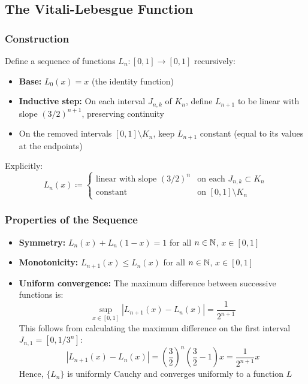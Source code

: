 \subsection{The Vitali-Lebesgue Function}

\subsubsection{Construction}

Define a sequence of functions $L_n:[0,1] \to [0,1]$ recursively:

\begin{itemize}
    \item \textbf{Base:} $L_0(x) = x$ (the identity function)
    \item \textbf{Inductive step:} On each interval $J_{n,k}$ of $K_n$, define $L_{n+1}$ to be linear with slope $(3/2)^{n+1}$, preserving continuity
    \item On the removed intervals $[0,1] \setminus K_n$, keep $L_{n+1}$ constant (equal to its values at the endpoints)
\end{itemize}

Explicitly:
\[
L_n(x) \coloneqq 
\begin{cases}
\text{linear with slope } (3/2)^n & \text{on each } J_{n,k} \subset K_n \\
\text{constant} & \text{on } [0,1] \setminus K_n
\end{cases}
\]

\subsubsection{Properties of the Sequence}

\begin{itemize}
    \item \textbf{Symmetry:} $L_n(x) + L_n(1-x) = 1$ for all $n \in \mathbb{N}$, $x \in [0,1]$
    \item \textbf{Monotonicity:} $L_{n+1}(x) \leq L_n(x)$ for all $n \in \mathbb{N}$, $x \in [0,1]$
    \item \textbf{Uniform convergence:} The maximum difference between successive functions is:
    \[
    \sup_{x \in [0,1]} |L_{n+1}(x) - L_n(x)| = \frac{1}{2^{n+1}}
    \]
    This follows from calculating the maximum difference on the first interval $J_{n,1} = [0, 1/3^n]$:
    \[
    |L_{n+1}(x) - L_n(x)| = \left( \frac{3}{2} \right)^n \left( \frac{3}{2} - 1 \right) x = \frac{1}{2^{n+1}} x
    \]
    Hence, $\{L_n\}$ is uniformly Cauchy and converges uniformly to a function $L$
\end{itemize}

